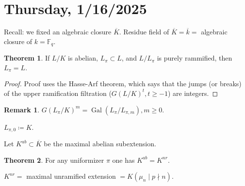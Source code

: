 \documentclass{article}
\theoremstyle{definition}
\newtheorem{theorem}{Theorem}
\numberwithin{theorem}{subsection}
\newtheorem*{remark}{Remark}
\begin{document}
    \section*{Thursday, 1/16/2025}
    
    Recall: we fixed an algebraic closure \(\overline{K}\). Residue field of \(\overline{K} = \overline{k} = \) algebraic closure of \(k = \mathbb{F}_q\).
    
    \begin{theorem}
        If \(L / K\) is abelian, \(L_{\pi} \subset L\), and \(L / L_\pi\) is purely rammified, then \(L_\pi = L\).
    \end{theorem}
    
    \begin{proof}
        Proof uses the Hasse-Arf theorem, which says that the jumps (or breaks) of the upper ramification filtration (\(G(L / K)^t, t \geq -1\)) are integers.
    \end{proof}

    \begin{remark}
        \(G(L_\pi / K)^m = \operatorname{Gal}(L_\pi / L_{\pi,m}), m \geq 0\).
        
        \(L_{\pi, 0} \coloneqq K\).
    \end{remark}

    Let \(K^{ab} \subset \overline{K}\) be the maximal abelian subextension.

    \begin{theorem}
        For any uniformizer \(\pi\) one has \(K^{ab} = K^{nr}\).
        
        \(K^{nr} =\) maximal unramified extension \(= K(\mu_n \mid p \nmid n)\). 
    \end{theorem}
\end{document}

